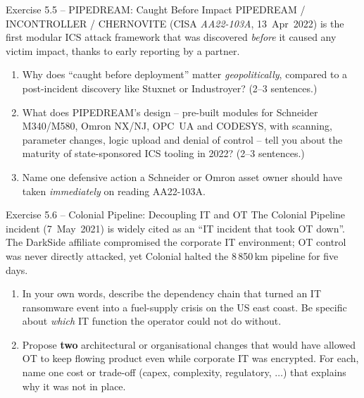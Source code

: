 \documentclass[11pt,a4paper]{article}
\begin{document}
\begin{taskbox}{Exercise 5.5 -- PIPEDREAM: Caught Before Impact}
PIPEDREAM / INCONTROLLER / CHERNOVITE (CISA \emph{AA22-103A}, 13~Apr~2022) is the first modular
ICS attack framework that was discovered \emph{before} it caused any victim impact, thanks to
early reporting by a partner.
\begin{enumerate}\setlength{\itemsep}{0pt}
  \item Why does ``caught before deployment'' matter \emph{geopolitically}, compared to a
        post-incident discovery like Stuxnet or Industroyer? (2--3 sentences.)
  \item What does PIPEDREAM's design -- pre-built modules for Schneider M340/M580, Omron NX/NJ,
        OPC~UA and CODESYS, with scanning, parameter changes, logic upload and denial of
        control -- tell you about the maturity of state-sponsored ICS tooling in 2022? (2--3
        sentences.)
  \item Name one defensive action a Schneider or Omron asset owner should have taken
        \emph{immediately} on reading AA22-103A.
\end{enumerate}
\end{taskbox}

\begin{taskbox}{Exercise 5.6 -- Colonial Pipeline: Decoupling IT and OT}
The Colonial Pipeline incident (7~May~2021) is widely cited as an ``IT incident that took OT
down''. The DarkSide affiliate compromised the corporate IT environment; OT control was never
directly attacked, yet Colonial halted the 8\,850\,km pipeline for five days.
\begin{enumerate}\setlength{\itemsep}{0pt}
  \item In your own words, describe the dependency chain that turned an IT ransomware event
        into a fuel-supply crisis on the US east coast. Be specific about \emph{which} IT
        function the operator could not do without.
  \item Propose \textbf{two} architectural or organisational changes that would have allowed
        OT to keep flowing product even while corporate IT was encrypted. For each, name one
        cost or trade-off (capex, complexity, regulatory, $\ldots$) that explains why it was
        not in place.
\end{enumerate}
\end{taskbox}
\end{document}
